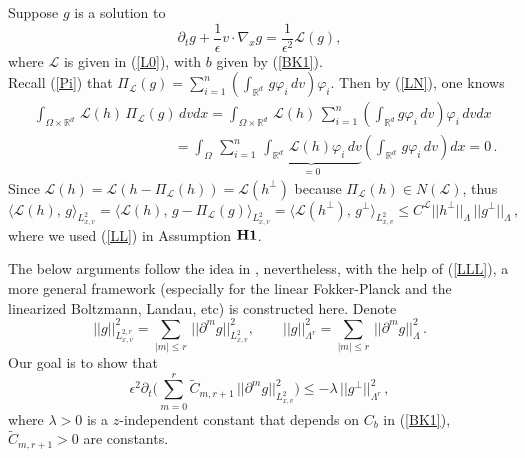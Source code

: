 \documentclass[final,onefignum,onetabnum]{siamart171218}
\begin{document}
Suppose $g$ is a solution to 
\begin{equation}\label{g1}\partial_t g +\frac{1}{\epsilon}v\cdot\nabla_x g= \frac{1}{\epsilon^2}\mathcal L(g), \end{equation}
where $\mathcal L$ is given in (\ref{L0}), with $b$ given by (\ref{BK1}). \\
Recall (\ref{Pi}) that $\displaystyle\Pi_{\mathcal L} (g) = \sum_{i=1}^{n} \left(\int_{\mathbb R^d}\, g\varphi_i\, dv \right)\varphi_i$. Then by (\ref{LN}), one knows
\begin{align*}
&\displaystyle\int_{\Omega\times\mathbb R^d}\, \mathcal L(h)\, \Pi_{\mathcal L}(g)\, dvdx
=\int_{\Omega\times\mathbb R^d}\,  \mathcal L(h)\, \sum_{i=1}^{n}\left(\int_{\mathbb R^d} g\varphi_i\, dv\right)\varphi_i\, dvdx \\[2pt]
&\displaystyle \qquad\qquad\qquad\qquad\qquad=\int_{\Omega}\, \sum_{i=1}^{n}\, \underbrace{\int_{\mathbb R^d}\, \mathcal L(h)\varphi_i\, dv}_{=0}
\left(\int_{\mathbb R^d}\, g\varphi_i\,dv\right) dx=0\,.
\end{align*}
Since $\mathcal L(h)=\mathcal L(h-\Pi_{\mathcal L}(h))=\mathcal L(h^{\perp})$ because
$\Pi_{\mathcal L}(h) \in N(\mathcal L)$, thus 
\begin{equation}\label{LLL}\langle \mathcal L(h), \, g\rangle_{L^2_{x,v}}=\langle \mathcal L(h), \, g-\Pi_{\mathcal L}(g)\rangle_{L^2_{x,v}}=
\langle \mathcal L(h^{\perp}), \, g^{\perp}\rangle_{L^2_{x,v}}\leq C^{\mathcal L} ||h^{\perp}||_{\Lambda}\, ||g^{\perp}||_{\Lambda}\,, 
\end{equation}
where we used (\ref{LL}) in Assumption ${\bf H1}$. 

The below arguments follow the idea in \cite{Ma, Liu}, nevertheless, with the help of (\ref{LLL}), 
a more general framework (especially for the linear Fokker-Planck and 
the linearized Boltzmann, Landau, etc) is constructed here. 
Denote $$||g||_{L_{x,v}^{2,r}}^2 = \sum_{|m|\leq r}\, ||\partial^m g||_{L^2_{x,v}}^2, \qquad
||g||_{\Lambda^{r}}^2 = \sum_{|m|\leq r}\, ||\partial^{m}g||_{\Lambda}^2\,. $$
Our goal is to show that 
\begin{equation}\label{Cm}\epsilon^2 \partial_t \bigg(\sum_{m=0}^{r} \widetilde C_{m,r+1}\,  ||\partial^m g||_{L^2_{x,v}}^2\bigg) \leq -\lambda\, ||g^{\perp}||
_{\Lambda^{r}}^2\,,\end{equation}
where $\lambda>0$ is a $z$-independent constant that depends on $C_b$ in (\ref{BK1}), $\widetilde C_{m,r+1}>0$ are constants. 
\end{document}
